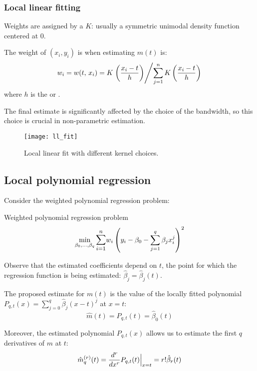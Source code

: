 \subsubsection{Local linear fitting}
Weights are assigned by a  $K$: usually a
symmetric unimodal density function centered at $0$.

The weight of $(x_i, y_i)$ is when estimating $m(t)$ is:
\begin{equation*}
	w_i = w(t,\,x_i) = K \left. \left( \frac{x_i - t}{h} \right) \middle/ \sum_{j=1}^n K \left( \frac{x_i - t}{h} \right) \right.
\end{equation*}
where $h$ is the  or .

\begin{note}
	The final estimate is significantly affected by the choice of the bandwidth, so this
	choice is crucial in non-parametric estimation.
\end{note}

\begin{figure}[H]
	\texttt{[image: ll\_fit]}
	\caption{Local linear fit with different kernel choices.}
\end{figure}

\subsection{Local polynomial regression}
Consider the weighted polynomial regression problem:
\begin{problem}{Weighted polynomial regression problem}{}
\begin{equation*}
	\min_{\beta_0,\ldots,\beta_q} \mathlarger{\sum_{i=1}^n} w_i \left( y_i - \beta_0 - \sum_{j=1}^q \beta_j x_i^j \right)^2
\end{equation*}
\end{problem}
Observe that the estimated coefficients depend on $t$, the
point for which the regression function is being estimated: $\hat\beta_j = \hat\beta_j(t)$.

The proposed estimate for $m(t)$ is the value of the locally fitted
polynomial $P_{q,t}(x) = \sum_{j=0}^q \hat\beta_j(x - t)^j$ at $x = t$:
\begin{equation*}
	\hat{m}(t) = P_{q,t}(t) = \hat\beta_0(t)
\end{equation*}

Moreover, the estimated polynomial $P_{q,t}(x)$ allows us to estimate the first $q$ derivatives
of $m$ at $t$:
\begin{equation*}
	\hat{m}_q^{(r)}(t) = \frac{d^r}{dx^r} P_{q,t}(t) {\Bigm|_{x=t}} = r! \hat\beta_r(t)
\end{equation*}

